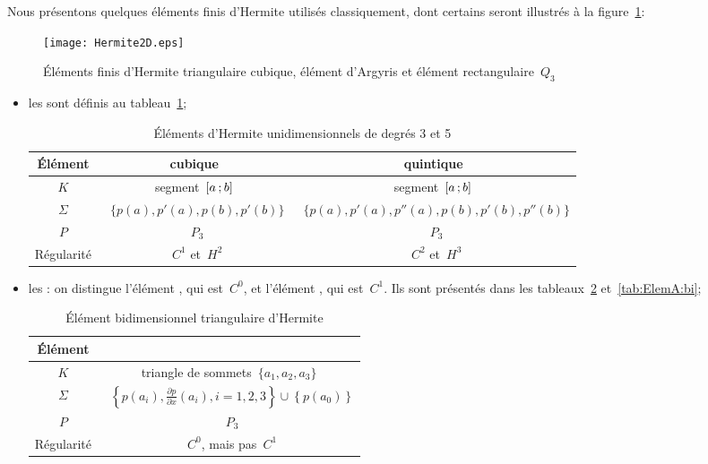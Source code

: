 Nous présentons quelques éléments finis d'Hermite utilisés classiquement, dont certains seront illustrés à la figure~\ref{Hermite2D}:
\begin{figure}[ht]
\centering
\texttt{[image: Hermite2D.eps]}
\caption{Éléments finis d'Hermite triangulaire cubique, élément d'Argyris et élément rectangulaire~$Q_3$}\label{Hermite2D}
\end{figure}
\begin{itemize}
\item les  sont définis au tableau~\ref{tab:ElemH:uni};
\begin{table}[ht]\centering\small
\begin{tabular}{c|cc}
Élément & cubique & quintique\\
\hline
$K$	  & segment~$\mathopen{[}a\,;b\mathclose{]}$ & segment~$\mathopen{[}a\,;b\mathclose{]}$\\
$\Sigma$ &~$\{p(a), p'(a), p(b), p'(b)\}$ &~$\{p(a), p'(a), p''(a), p(b), p'(b), p''(b)\}$\\
$P$   &~$P_3$ &~$P_3$\\
Régularité &~$C^1$ et~$H^2$ &~$C^2$ et~$H^3$\\
\hline
\end{tabular}
\caption{Éléments d'Hermite unidimensionnels de degrés 3 et 5}\label{tab:ElemH:uni}
\end{table}
\item les :
	on distingue l'élément , qui est~$C^0$, et
  l'élément , qui est~$C^1$.
	Ils sont présentés dans les tableaux~\ref{tab:ElemH:bi} et~\ref{tab:ElemA:bi};
\begin{table}[ht]\centering\small
\begin{tabular}{c|c}
Élément &\\
\hline
$K$	  & triangle de sommets~$\{a_1, a_2, a_3\}$\\
$\Sigma$ &~$\left\{p(a_i), \frac{\partial p}{\partial x}(a_i), i=1, 2, 3\right\} \cup\left\{p(a_0)\right\}$\\
$P$   &~$P_3$\\
Régularité &~$C^0$, mais pas~$C^1$\\
\hline
\end{tabular}\caption{Élément bidimensionnel triangulaire d'Hermite}\label{tab:ElemH:bi}
\end{table}
\begin{table}\centering\small
\begin{tabular}{c|cc}

\end{tabular}
\end{table}
\end{itemize}
